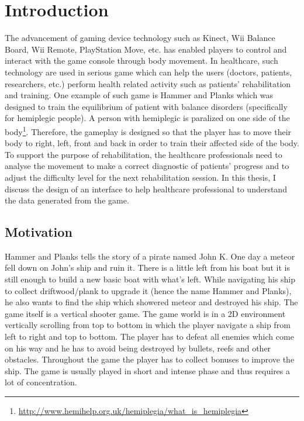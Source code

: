 \chapter{Introduction}
\label{chap:intro}

The advancement of gaming device technology such as Kinect, Wii Balance Board, Wii Remote, PlayStation Move, etc. has enabled players to control and interact with the game console through body movement. In healthcare, such technology are used in serious game which can help the users (doctors, patients, researchers, etc.)  perform health related activity such as patients' rehabilitation and training\cite{rahman,brezinka,green}. One example of such game is Hammer and Planks which was designed to train the equilibrium of patient with balance disorders (specifically for hemiplegic people)\cite{diloreto}. A person with hemiplegic is paralized on one side of the body\footnote{\url{http://www.hemihelp.org.uk/hemiplegia/what_is_hemiplegia}}. Therefore, the gameplay is designed so that the player has to move their body to right, left, front and back in order to train their affected side of the body. To support the purpose of rehabilitation, the healthcare professionals need to analyse the movement to  make a correct diagnostic of patients' progress and to adjust the difficulty level for the next rehabilitation session. In this thesis, I discuss the design of an interface to help healthcare professional to understand the data generated from the game.

\section{Motivation}

Hammer and Planks tells the story of a pirate named John K. One day a meteor fell down on John's ship and ruin it. There is a little left from his boat but it is still enough to build a new basic boat with what's left. While navigating his ship to collect driftwood/plank to upgrade it (hence the name Hammer and Planks), he also wants to find the ship which showered meteor and destroyed his ship. The game itself is a vertical shooter game. The game world is in a 2D environment vertically scrolling from top to bottom in which the player navigate a ship from left to right and top to bottom. The player has to defeat all enemies which come on his way and he has to avoid being destroyed by bullets, reefs and other obstacles. Throughout the game the player has to collect bonuses to improve the ship. The game is usually played in short and intense phase and thus requires a lot of concentration\cite{diloreto}.

